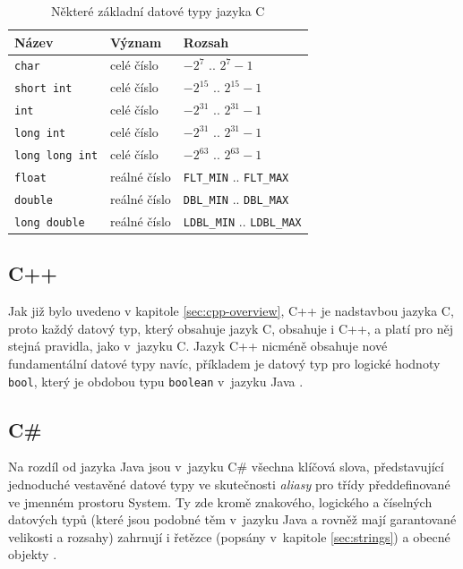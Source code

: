 \documentclass[onepage, a4paper, 12pt]{bakalarka}
\begin{document}
\begin{table}\centering
\caption{Některé základní datové typy jazyka C}
\begin{tabular}{| l | l | l |}
\hline
\textbf{Název} & \textbf{Význam} & \textbf{Rozsah} \\ \hline
\texttt{char} & celé číslo & $-2^7$ .. $2^7-1$ \\ \hline
\texttt{short int} & celé číslo & $-2^{15}$ .. $2^{15}-1$ \\ \hline
\texttt{int} & celé číslo & $-2^{31}$ .. $2^{31}-1$ \\ \hline
\texttt{long int} & celé číslo & $-2^{31}$ .. $2^{31}-1$ \\ \hline
\texttt{long long int} & celé číslo & $-2^{63}$ .. $2^{63}-1$ \\ \hline
\texttt{float} & reálné číslo & \texttt{FLT\_MIN} .. \texttt{FLT\_MAX} \\ \hline
\texttt{double} & reálné číslo & \texttt{DBL\_MIN} .. \texttt{DBL\_MAX} \\ \hline
\texttt{long double} & reálné číslo & \texttt{LDBL\_MIN} .. \texttt{LDBL\_MAX} \\ \hline
\end{tabular}
\label{table:c-types}
\end{table}

\subsection{C++}
Jak již bylo uvedeno v kapitole \ref{sec:cpp-overview}, C++ je nadstavbou jazyka C, proto každý datový typ, který obsahuje jazyk C, obsahuje i C++, a platí pro něj stejná pravidla, jako v~jazyku C. Jazyk C++ nicméně obsahuje nové fundamentální datové typy navíc, příkladem je datový typ pro logické hodnoty \texttt{bool}, který je obdobou typu \texttt{boolean} v~jazyku Java \cite{cpp-book, cpp-guide-types}.\par

\subsection{C\#}
Na rozdíl od jazyka Java jsou v~jazyku C\# všechna klíčová slova, představující jednoduché vestavěné datové typy ve skutečnosti \textit{aliasy} pro třídy předdefinované ve jmenném prostoru System. Ty zde kromě znakového, logického a číselných datových typů (které jsou podobné těm v~jazyku Java a rovněž mají garantované velikosti a rozsahy) zahrnují i řetězce (popsány v~kapitole \ref{sec:strings}) a obecné objekty \cite{cs-book, cs-guide-types, cs-guide-sbyte, cs-guide-short, cs-guide-int, cs-guide-long, cs-guide-float, cs-guide-double, cs-guide-bool, cs-guide-char}.
\end{document}
